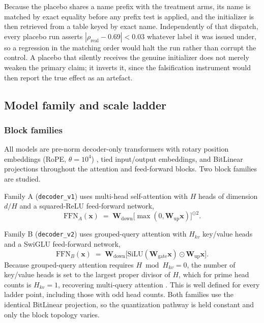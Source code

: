 \documentclass[final,5p,times,twocolumn]{elsarticle}
\theoremstyle{remark}
\newcommand{\Wm}{\mathbf{W}}
\newcommand{\xv}{\mathbf{x}}
\begin{document}
Because the placebo shares a name prefix with the treatment arms, its name is
matched by exact equality before any prefix test is applied, and the
initializer is then retrieved from a table keyed by exact name. Independently
of that dispatch, every placebo run asserts
$|\rho_{\mathrm{real}} - 0.69| < 0.03$ whatever label it was issued under, so a
regression in the matching order would halt the run rather than corrupt the
control.
A placebo that silently receives the genuine initializer does not merely weaken
the primary claim; it inverts it, since the falsification instrument would then
report the true effect as an artefact.

\subsection{Model family and scale ladder}
\label{sec:arch}

\subsubsection{Block families}

All models are pre-norm decoder-only transformers with rotary position
embeddings (RoPE, $\theta = 10^{4}$) \cite{su2024}, tied input/output
embeddings, and
BitLinear projections throughout the attention and feed-forward blocks. Two
block families are studied.

Family A (\texttt{decoder\_v1}) uses multi-head self-attention with
$H$ heads of dimension $d/H$ and a squared-ReLU \cite{so2021} feed-forward
network,
\begin{equation}
\label{eq:ffn1}
\mathrm{FFN}_{A}(\xv) \;=\; \Wm_{\mathrm{down}}
\big[\max(0, \Wm_{\mathrm{up}}\xv)\big]^{\odot 2}.
\end{equation}

Family B (\texttt{decoder\_v2}) uses grouped-query attention
\cite{ainslie2023} with $H_{kv}$ key/value heads and a SwiGLU
\cite{shazeer2020} feed-forward network,
\begin{equation}
\label{eq:ffn2}
\mathrm{FFN}_{B}(\xv) \;=\; \Wm_{\mathrm{down}}
\big[\mathrm{SiLU}(\Wm_{\mathrm{gate}}\xv) \odot \Wm_{\mathrm{up}}\xv\big].
\end{equation}
Because grouped-query attention requires $H \bmod H_{kv} = 0$, the number of
key/value heads is set to the largest proper divisor of $H$, which for prime
head counts is $H_{kv}=1$, recovering multi-query attention
\cite{shazeer2019}. This is well defined for every ladder point, including those with odd
head counts. Both families use the identical BitLinear projection, so the
quantization pathway is held constant and only the block topology varies.
\end{document}
